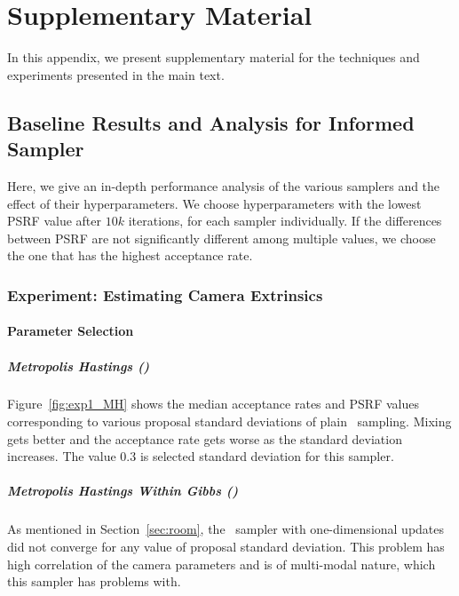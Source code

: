 \chapter{Supplementary Material}
\label{appendix}

In this appendix, we present supplementary material for the techniques and
experiments presented in the main text.

\section{Baseline Results and Analysis for Informed Sampler}
\label{appendix:chap3}

Here, we give an in-depth
performance analysis of the various samplers and the effect of their
hyperparameters. We choose hyperparameters with the lowest PSRF value
after $10k$ iterations, for each sampler individually. If the
differences between PSRF are not significantly different among
multiple values, we choose the one that has the highest acceptance
rate.

\subsection{Experiment: Estimating Camera Extrinsics}
\label{appendix:chap3:room}

\subsubsection{Parameter Selection}
\paragraph{Metropolis Hastings (\MH)}

Figure~\ref{fig:exp1_MH} shows the median acceptance rates and PSRF
values corresponding to various proposal standard deviations of plain
\MH~sampling. Mixing gets better and the acceptance rate gets worse as
the standard deviation increases. The value $0.3$ is selected standard
deviation for this sampler.

\paragraph{Metropolis Hastings Within Gibbs (\MHWG)}

As mentioned in Section~\ref{sec:room}, the \MHWG~sampler with one-dimensional
updates did not converge for any value of proposal standard deviation.
This problem has high correlation of the camera parameters and is of
multi-modal nature, which this sampler has problems with.

